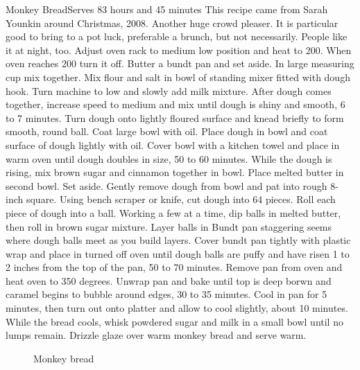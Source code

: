 \begin{recipe}{Monkey Bread}{Serves 8}{3 hours and 45 minutes}
\freeform This recipe came from Sarah Younkin around Christmas, 2008.  Another huge crowd pleaser.  It is particular good to bring to a pot luck, preferable a brunch, but not necessarily.  People like it at night, too.
\newstep
Adjust oven rack to medium low position and heat to 200\0.  When oven reaches 200\0 turn it off.
Butter a bundt pan and set aside.
In large measuring cup mix together.
Mix flour and salt in bowl of standing mixer fitted with dough hook.
\newstep
Turn machine to low and slowly add milk mixture.  After dough comes together, increase speed to medium and mix until dough is shiny and smooth, 6 to 7 minutes. Turn dough onto lightly floured surface and knead briefly to form smooth, round ball. Coat large bowl with oil. Place dough in bowl and coat surface of dough lightly with oil. Cover bowl with a kitchen towel and place in warm oven until dough doubles in size, 50 to 60 minutes.
While the dough is rising, mix brown sugar and cinnamon together in bowl. Place melted butter in second bowl. Set aside.
\newstep
Gently remove dough from bowl and pat into rough 8-inch square. Using bench scraper or knife, cut dough into 64 pieces.
\newstep
Roll each piece of dough into a ball. Working a few at a time, dip balls in melted butter, then roll in brown sugar mixture. Layer balls in Bundt pan staggering seems where dough balls meet as you build layers.
\newstep
Cover bundt pan tightly with plastic wrap and place in turned off oven until dough balls are puffy and have risen 1 to 2 inches from the top of the pan, 50 to 70 minutes.
\newstep
Remove pan from oven and heat oven to 350 degrees. Unwrap pan and bake until top is deep borwn and caramel begins to bubble around edges, 30 to 35 minutes. Cool in pan for 5 minutes, then turn out onto platter and allow to cool slightly, about 10 minutes.
While the bread cools, whisk powdered sugar and milk in a small bowl until no lumps remain. Drizzle glaze over warm monkey bread and serve warm. 
\end{recipe}
\begin{figure}
\begin{center}
\end{center}
\caption*{Monkey bread}
\end{figure}
\clearpage
